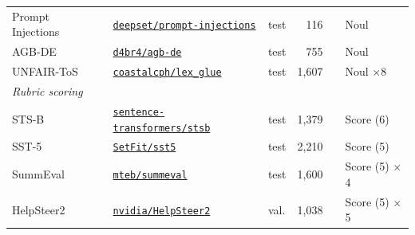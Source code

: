 \begin{tabular}{l l l r r l}
    \rowcolor{gray!10}Prompt Injections~\cite{deepset2023promptinjections} & {\scriptsize\href{https://huggingface.co/datasets/deepset/prompt-injections}{\texttt{deepset/prompt-injections}}} & test & 116 &  & Noul \\
    AGB-DE~\cite{braun-matthes-2024-agb} & {\scriptsize\href{https://huggingface.co/datasets/d4br4/agb-de}{\texttt{d4br4/agb-de}}} & test & 755 &  & Noul \\
    \rowcolor{gray!10}UNFAIR-ToS~\cite{chalkidis-etal-2021-lexglue} & {\scriptsize\href{https://huggingface.co/datasets/coastalcph/lex_glue}{\texttt{coastalcph/lex\_glue}}} & test & 1{,}607 &  & Noul $\times$8 \\
    \midrule
    \multicolumn{6}{l}{\textit{Rubric scoring}} \\
    STS-B~\cite{cer-etal-2017-semeval} & {\scriptsize\href{https://huggingface.co/datasets/sentence-transformers/stsb}{\texttt{sentence-transformers/stsb}}} & test & 1{,}379 &  & Score (6) \\
    \rowcolor{gray!10}SST-5~\cite{socher-etal-2013-recursive} & {\scriptsize\href{https://huggingface.co/datasets/SetFit/sst5}{\texttt{SetFit/sst5}}} & test & 2{,}210 &  & Score (5) \\
    SummEval~\cite{fabbri2021summeval} & {\scriptsize\href{https://huggingface.co/datasets/mteb/summeval}{\texttt{mteb/summeval}}} & test & 1{,}600 &  & Score (5) $\times$4 \\
    \rowcolor{gray!10}HelpSteer2~\cite{wang2024helpsteer2} & {\scriptsize\href{https://huggingface.co/datasets/nvidia/HelpSteer2}{\texttt{nvidia/HelpSteer2}}} & val. & 1{,}038 &  & Score (5) $\times$5 \\
    \bottomrule
\end{tabular}

